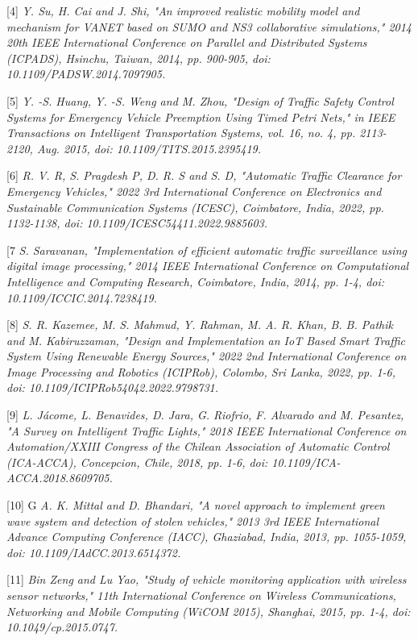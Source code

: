 \documentclass[conference]{IEEEtran}
\begin{document}
 [4]\emph{ Y. Su, H. Cai and J. Shi, "An improved realistic mobility model and mechanism for VANET based on SUMO and NS3 collaborative simulations," 2014 20th IEEE International Conference on Parallel and Distributed Systems (ICPADS), Hsinchu, Taiwan, 2014, pp. 900-905, doi: 10.1109/PADSW.2014.7097905.}

[5]\emph{  Y. -S. Huang, Y. -S. Weng and M. Zhou, "Design of Traffic Safety Control Systems for Emergency Vehicle Preemption Using Timed Petri Nets," in IEEE Transactions on Intelligent Transportation Systems, vol. 16, no. 4, pp. 2113-2120, Aug. 2015, doi: 10.1109/TITS.2015.2395419. }
 
[6]\emph{ R. V. R, S. Pragdesh P, D. R. S and S. D, "Automatic Traffic Clearance for Emergency Vehicles," 2022 3rd International Conference on Electronics and Sustainable Communication Systems (ICESC), Coimbatore, India, 2022, pp. 1132-1138, doi: 10.1109/ICESC54411.2022.9885603. }

[7\emph{ S. Saravanan, "Implementation of efficient automatic traffic surveillance using digital image processing," 2014 IEEE International Conference on Computational Intelligence and Computing Research, Coimbatore, India, 2014, pp. 1-4, doi: 10.1109/ICCIC.2014.7238419. }

[8] \emph{ S. R. Kazemee, M. S. Mahmud, Y. Rahman, M. A. R. Khan, B. B. Pathik and M. Kabiruzzaman, "Design and Implementation an IoT Based Smart Traffic System Using Renewable Energy Sources," 2022 2nd International Conference on Image Processing and Robotics (ICIPRob), Colombo, Sri Lanka, 2022, pp. 1-6, doi: 10.1109/ICIPRob54042.2022.9798731. }

[9] \emph{ L. Jácome, L. Benavides, D. Jara, G. Riofrio, F. Alvarado and M. Pesantez, "A Survey on Intelligent Traffic Lights," 2018 IEEE International Conference on Automation/XXIII Congress of the Chilean Association of Automatic Control (ICA-ACCA), Concepcion, Chile, 2018, pp. 1-6, doi: 10.1109/ICA-ACCA.2018.8609705. }

[10] G\emph{ A. K. Mittal and D. Bhandari, "A novel approach to implement green wave system and detection of stolen vehicles," 2013 3rd IEEE International Advance Computing Conference (IACC), Ghaziabad, India, 2013, pp. 1055-1059, doi: 10.1109/IAdCC.2013.6514372. }


[11]\emph{ Bin Zeng and Lu Yao, "Study of vehicle monitoring application with wireless sensor networks," 11th International Conference on Wireless Communications, Networking and Mobile Computing (WiCOM 2015), Shanghai, 2015, pp. 1-4, doi: 10.1049/cp.2015.0747. }
\end{document}
